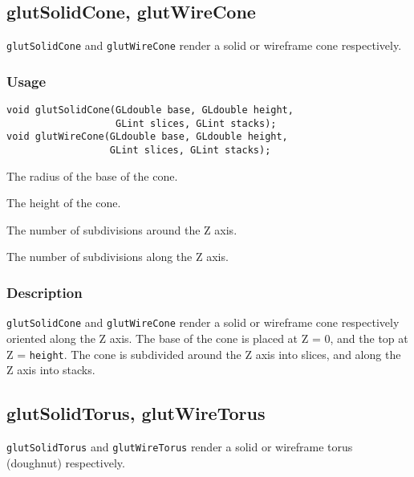 \subsection{glutSolidCone, glutWireCone}

{\tt glutSolidCone} and {\tt glutWireCone} render a solid or wireframe
cone respectively.

\subsubsection*{Usage}
\begin{verbatim}
void glutSolidCone(GLdouble base, GLdouble height,
                   GLint slices, GLint stacks);
void glutWireCone(GLdouble base, GLdouble height,
                  GLint slices, GLint stacks);
\end{verbatim}
\begin{description}
\itemsep 0in
\item[\tt base]
The radius of the base of the cone.
\item[\tt height]
The height of the cone.
\item[\tt slices]
The number of subdivisions around the Z axis.
\item[\tt stacks]
The number of subdivisions along the Z axis.
\end{description}

\subsubsection*{Description}

{\tt glutSolidCone} and {\tt glutWireCone} render a solid or wireframe
cone respectively oriented along the Z axis.  The base of the cone
is placed at Z = 0, and the top at Z = {\tt height}.  The cone is subdivided
around the Z axis into slices, and along the Z axis into stacks.

\subsection{glutSolidTorus, glutWireTorus}

{\tt glutSolidTorus} and {\tt glutWireTorus} render a solid or wireframe
torus (doughnut) respectively.

